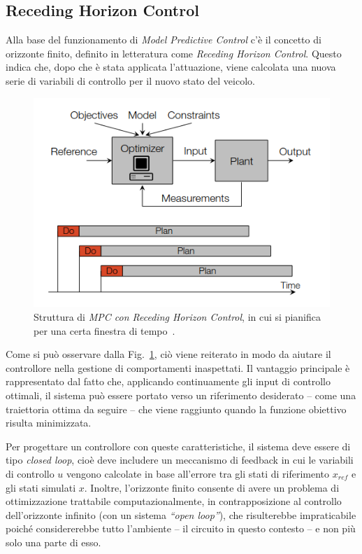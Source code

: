 \subsection{Receding Horizon Control}
Alla base del funzionamento di \textit{Model Predictive Control} c'è il concetto di orizzonte finito, definito in letteratura come \textit{Receding Horizon Control}. 
Questo indica che, dopo che è stata applicata l'attuazione, viene calcolata una nuova serie di 
variabili di controllo per il nuovo stato del veicolo. 
\begin{figure}[H]
    \centering
    \includegraphics[scale=0.6]{images/mpc_horizon.png}
    \caption{Struttura di \textit{MPC con Receding Horizon Control}, in cui si pianifica per una 
    certa finestra di tempo~\cite{f1tenthcoursel13}.}
    \label{fig:fig9} %
\end{figure}
Come si può osservare dalla Fig.~\ref{fig:fig9}, ciò viene reiterato in modo da aiutare il 
controllore nella gestione di comportamenti inaspettati.
Il vantaggio principale è rappresentato dal fatto che, 
applicando continuamente gli input di controllo ottimali, 
il sistema può essere portato verso un riferimento 
desiderato -- come una traiettoria ottima da seguire -- 
che viene raggiunto quando la funzione obiettivo risulta minimizzata.

Per progettare un controllore con queste caratteristiche, il sistema deve essere di tipo 
\textit{closed loop}, cioè deve includere un meccanismo di feedback in cui le variabili di 
controllo $u$ vengono calcolate in base all'errore tra gli stati di riferimento $x_{r e f}$ e gli stati simulati $x$.
Inoltre, l’orizzonte finito consente di avere un problema di ottimizzazione trattabile 
computazionalmente, in contrapposizione al controllo dell’orizzonte infinito 
(con un sistema \textit{``open loop''}), che risulterebbe impraticabile poiché 
considererebbe tutto l'ambiente -- il circuito in questo contesto -- e non più solo una parte di esso.

